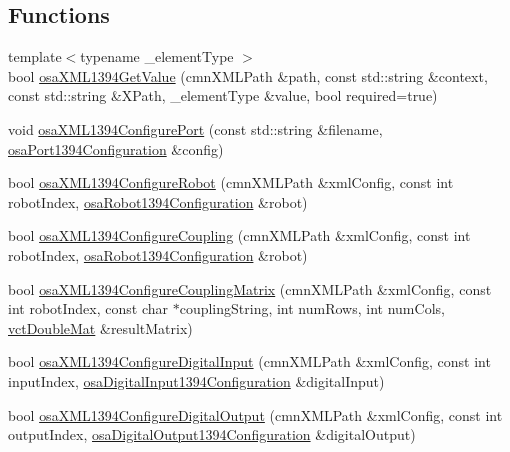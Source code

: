\subsection*{Functions}
\begin{DoxyCompactItemize}
\item 
{\footnotesize template$<$typename \-\_\-element\-Type $>$ }\\bool \hyperlink{namespacesaw_robot_i_o1394_a87bdce8e9df2e34af77e2a28c45824b1}{osa\-X\-M\-L1394\-Get\-Value} (cmn\-X\-M\-L\-Path \&path, const std\-::string \&context, const std\-::string \&X\-Path, \-\_\-element\-Type \&value, bool required=true)
\item 
void \hyperlink{namespacesaw_robot_i_o1394_a8b63d179d862acce1acc0c70eb9fc57b}{osa\-X\-M\-L1394\-Configure\-Port} (const std\-::string \&filename, \hyperlink{structsaw_robot_i_o1394_1_1osa_port1394_configuration}{osa\-Port1394\-Configuration} \&config)
\item 
bool \hyperlink{namespacesaw_robot_i_o1394_a0c7d844d6fc4e4a9b24b96e1062fe055}{osa\-X\-M\-L1394\-Configure\-Robot} (cmn\-X\-M\-L\-Path \&xml\-Config, const int robot\-Index, \hyperlink{structsaw_robot_i_o1394_1_1osa_robot1394_configuration}{osa\-Robot1394\-Configuration} \&robot)
\item 
bool \hyperlink{namespacesaw_robot_i_o1394_ad2d50cafd06a531000af16cc21244ec9}{osa\-X\-M\-L1394\-Configure\-Coupling} (cmn\-X\-M\-L\-Path \&xml\-Config, const int robot\-Index, \hyperlink{structsaw_robot_i_o1394_1_1osa_robot1394_configuration}{osa\-Robot1394\-Configuration} \&robot)
\item 
bool \hyperlink{namespacesaw_robot_i_o1394_a0449ee65c8c8bc66d6091a7ea81d05d4}{osa\-X\-M\-L1394\-Configure\-Coupling\-Matrix} (cmn\-X\-M\-L\-Path \&xml\-Config, const int robot\-Index, const char $\ast$coupling\-String, int num\-Rows, int num\-Cols, \hyperlink{vct_dynamic_matrix_types_8h_a48f1eb2461d20a99e824ee5753a37c84}{vct\-Double\-Mat} \&result\-Matrix)
\item 
bool \hyperlink{namespacesaw_robot_i_o1394_afe4cbf4be858c0e2acb0cad9883db82d}{osa\-X\-M\-L1394\-Configure\-Digital\-Input} (cmn\-X\-M\-L\-Path \&xml\-Config, const int input\-Index, \hyperlink{structsaw_robot_i_o1394_1_1osa_digital_input1394_configuration}{osa\-Digital\-Input1394\-Configuration} \&digital\-Input)
\item 
bool \hyperlink{namespacesaw_robot_i_o1394_a6c2ecda12f50e166af6b35d860de2a71}{osa\-X\-M\-L1394\-Configure\-Digital\-Output} (cmn\-X\-M\-L\-Path \&xml\-Config, const int output\-Index, \hyperlink{structsaw_robot_i_o1394_1_1osa_digital_output1394_configuration}{osa\-Digital\-Output1394\-Configuration} \&digital\-Output)
\end{DoxyCompactItemize}
